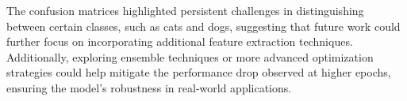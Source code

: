 \documentclass[10pt,twocolumn,letterpaper]{article}
\begin{document}
The confusion matrices highlighted persistent challenges in distinguishing between certain classes, such as cats and dogs, suggesting that future work could further focus on incorporating additional feature extraction techniques. Additionally, exploring ensemble techniques or more advanced optimization strategies could help mitigate the performance drop observed at higher epochs, ensuring the model's robustness in real-world applications.



{\small


}
\end{document}
